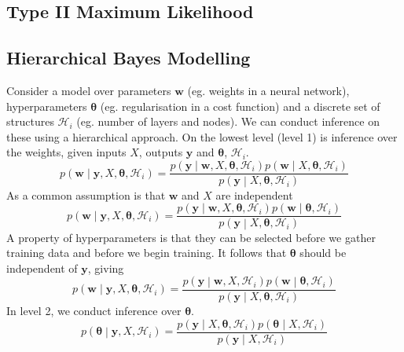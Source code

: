 \documentclass[11pt]{report} %
\begin{document}
\subsection{Type II Maximum Likelihood}

\subsection{Hierarchical Bayes Modelling \cite{Rasmussen2006}}

Consider a model over parameters $\mathbf{w}$ (eg. weights in a neural network), hyperparameters $\boldsymbol{\theta}$ (eg. regularisation in a cost function) and a discrete set of structures $\mathcal{H}_{i}$ (eg. number of layers and nodes). We can conduct inference on these using a hierarchical approach. On the lowest level (level 1) is inference over the weights, given inputs $X$, outputs $\mathbf{y}$ and $\boldsymbol{\theta}$, $\mathcal{H}_{i}$.
\begin{equation}
p\left(\mathbf{w}\middle|\mathbf{y}, X, \boldsymbol{\theta}, \mathcal{H}_{i}\right) = \dfrac{p\left(\mathbf{y}\middle|\mathbf{w}, X, \boldsymbol{\theta}, \mathcal{H}_{i}\right)p\left(\mathbf{w}\middle|X, \boldsymbol{\theta}, \mathcal{H}_{i}\right)}{p\left(\mathbf{y}\middle|X, \boldsymbol{\theta}, \mathcal{H}_{i}\right)}
\end{equation}
As a common assumption is that $\mathbf{w}$ and $X$ are independent
\begin{equation}
p\left(\mathbf{w}\middle|\mathbf{y}, X, \boldsymbol{\theta}, \mathcal{H}_{i}\right) = \dfrac{p\left(\mathbf{y}\middle|\mathbf{w}, X, \boldsymbol{\theta}, \mathcal{H}_{i}\right)p\left(\mathbf{w}\middle|\boldsymbol{\theta}, \mathcal{H}_{i}\right)}{p\left(\mathbf{y}\middle|X, \boldsymbol{\theta}, \mathcal{H}_{i}\right)}
\end{equation}
A property of hyperparameters is that they can be selected before we gather training data and before we begin training. It follows that $\boldsymbol{\theta}$ should be independent of $\mathbf{y}$, giving
\begin{equation}
p\left(\mathbf{w}\middle|\mathbf{y}, X, \boldsymbol{\theta}, \mathcal{H}_{i}\right) = \dfrac{p\left(\mathbf{y}\middle|\mathbf{w}, X, \mathcal{H}_{i}\right)p\left(\mathbf{w}\middle|\boldsymbol{\theta}, \mathcal{H}_{i}\right)}{p\left(\mathbf{y}\middle|X, \boldsymbol{\theta}, \mathcal{H}_{i}\right)}
\end{equation}
In level 2, we conduct inference over $\boldsymbol{\theta}$.
\begin{equation}
p\left(\boldsymbol{\theta}\middle|\mathbf{y}, X, \mathcal{H}_{i}\right) = \dfrac{p\left(\mathbf{y}\middle|X, \boldsymbol{\theta}, \mathcal{H}_{i}\right) p\left(\boldsymbol{\theta}\middle| X, \mathcal{H}_{i}\right)}{p\left(\mathbf{y}\middle|X, \mathcal{H}_{i}\right)}
\end{equation}
\end{document}
